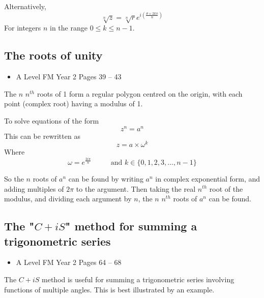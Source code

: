 \documentclass[11pt, a4paper]{article}
\begin{document}
Alternatively,
\begin{equation*}
\sqrt[n]{z}=\sqrt[n]{r}e^{i\left(\frac{\theta+2k\pi}{n}\right)}
\end{equation*}
For integers $n$ in the range $0\leq k \leq n-1$. \newline \par
\vspace{0.5cm}


\subsection{The roots of unity}
\begin{itemize}
\item A Level FM Year 2 \hspace{1cm} \phantom{AS /} Pages 39 -- 43
\end{itemize} \par
The $n$ $n^{th}$ roots of 1 form a regular polygon centred on the origin, with each point (complex root) having a modulus of 1. \newline \par

To solve equations of the form
\begin{equation*}
z^{n}=a^{n}
\end{equation*}
This can be rewritten as
\begin{equation*}
z=a\times\omega^{k}
\end{equation*}
Where
\begin{equation*}
\omega=e^{\frac{2i\pi}{n}}\hspace{1cm} \text{ and } k\in\{0,1,2,3,\dots,n-1\}
\end{equation*} \par

So the $n$ roots of $a^{n}$ can be found by writing $a^{n}$ in complex exponential form, and adding multiples of $2\pi$ to the argument. Then taking the real $n^{th}$ root of the modulus, and dividing each argument by $n$, the $n$ $n^{th}$ roots of $a^{n}$ can be found.
\vspace{0.5cm}


\subsection{The "$C+iS$" method for summing a trigonometric series}
\begin{itemize}
\item A Level FM Year 2 \hspace{1cm} \phantom{AS /} Pages 64 -- 68
\end{itemize} \par
The $C+iS$ method is useful for summing a trigonometric series involving functions of multiple angles. This is best illustrated by an example.
\end{document}
